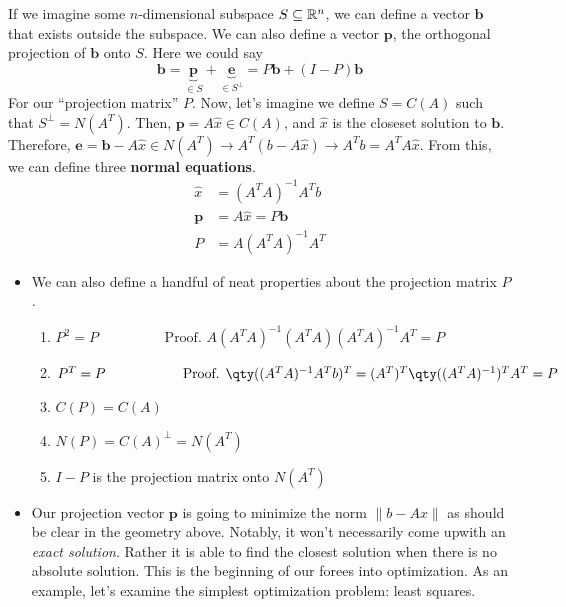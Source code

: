 \documentclass[11pt]{article}
\begin{document}
\parshape If we imagine some $n$-dimensional subspace $S \subseteq \mathbb{R}^{n}$, we can define a vector $\mathbf{b}$ that exists outside the subspace. We can also define a vector $\mathbf{p}$, the orthogonal projection of $\mathbf{b}$ onto $S$. Here we could say 
$$\mathbf{b} = \underbrace{\mathbf{p}}_{\in S} + \underbrace{\mathbf{e}}_{\in S^{\perp}} = P \mathbf{b} + (I -P) \mathbf{b}$$
For our ``projection matrix'' $P$. Now, let's imagine we define $S= C(A)$ such that $S^{\perp}= N(A^{T})$. Then, $\mathbf{p} = A \hat{x} \in C(A)$, and $\hat{x}$ is the closeset solution to $\mathbf{b}$. Therefore, $\mathbf{e} = \mathbf{b} - A\hat{x} \in N(A^{T}) \to A^{T} (b-A\hat{x}) \to A^{T}b = A^{T}A\hat{x}$. From this, we can define three \textbf{normal equations}. 
\begin{equation*}
\boxed{
\begin{align*}
			\hat{x} &= (A^{T}A)^{-1}A^{T}b \\
			\mathbf{p} &= A \hat{x} = P \mathbf{b} \\
			P &= A(A^{T}A)^{-1}A^{T}
	\end{align*}}
\end{equation*}
\begin{itemize}
	\item We can also define a handful of neat properties about the projection matrix $P$.
		\begin{enumerate}
			\item $P^{2} = P \hspace{2cm} \text{Proof.  } A(A^{T}A)^{-1}(A^{T}A)(A^{T}A)^{-1}A^{T} = P$
			\item $P^{T} = P \hspace{2cm} \text{Proof.  } \qty((A^{T}A)^{-1}A^{T}b)^{T} = (A^{T})^{T} \qty((A^{T}A)^{-1})^{T} A^{T} = P$
			\item $C(P)= C(A)$
			\item $N(P)= C(A)^{\perp} = N(A^{T})$
			\item $I-P$ is the projection matrix onto $N(A^{T})$

		\end{enumerate}
	\item Our projection vector $\mathbf{p}$ is going to minimize the norm $\|b-Ax\|$ as should be clear in the geometry above. Notably, it won't necessarily come upwith an \textit{exact solution}. Rather it is able to find the closest solution when there is no absolute solution. This is the beginning of our forees into optimization. As an example, let's examine the simplest optimization problem: least squares.
\end{itemize}
\end{document}
